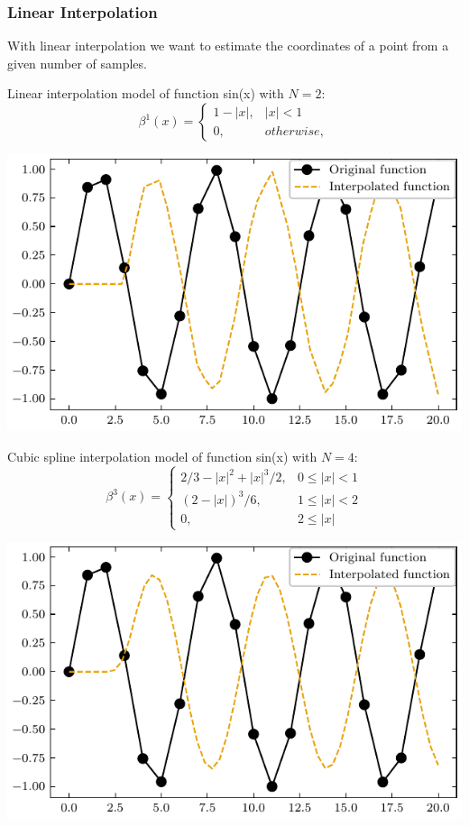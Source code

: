 \documentclass[]{usiinfbachelorproject}
\begin{document}
	\subsubsection{Linear Interpolation}
	With linear interpolation we want to estimate the coordinates of a point from a given number of samples. 
	
	Linear interpolation model of function sin(x) with $N = 2$:
	\begin{equation}
		\beta^1(x) = 
		\begin{cases}
			1 - |x|, & |x| < 1    \\
			0,       & otherwise, 
		\end{cases}
	\end{equation}
	\begin{center}
		\includegraphics{"images/linear_interpolation_example.pdf"}
	\end{center}
	
	Cubic spline interpolation model of function sin(x) with $N=4$:
	\begin{equation}
		\beta^3(x) = 
		\begin{cases}
			2/3 - |x|^2 + |x|^3/2, & 0 \leq|x| < 1  \\
			(2-|x|)^3/6,           & 1 \leq |x| < 2 \\
			0,                     & 2 \leq |x|     
		\end{cases}
	\end{equation} \cite{main_article}
	
	\begin{center}
		\includegraphics{"images/cubic_interpolation_example.pdf"}
	\end{center}
	
\end{document}
